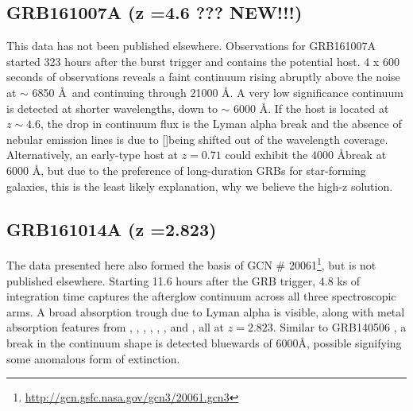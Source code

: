 \documentclass[iop, twocolappendix, numberedappendix, tighten, appendixfloats]{emulateapj}
\newcommand{\oii}{[\ion{O}{2}]}
\newcommand{\feii}{\ion{Fe}{2}}
\newcommand{\civ}{\ion{C}{4}}
\newcommand{\cii}{\ion{C}{2}}
\newcommand{\mgii}{\ion{Mg}{2}}
\newcommand{\alii}{\ion{Al}{2}}
\newcommand{\aliii}{\ion{Al}{3}}
\newcommand{\SIii}{\ion{Si}{2}}
\begin{document}
	\subsection{GRB161007A (z =4.6 ??? NEW!!!)}
	This data has not been published elsewhere. Observations for GRB161007A started
	323 hours after the burst trigger and contains the potential host. 4 x 600 seconds
	of observations reveals a faint continuum rising abruptly above the noise at
	$\sim$ 6850 \AA~and continuing through 21000 \AA. A very low significance
	continuum is detected at shorter wavelengths, down to $\sim$ 6000 \AA. If the
	host is located at $z \sim 4.6$, the drop in continuum flux is the Lyman alpha
	break and the absence of nebular emission lines is due to \oii being shifted
	out of the wavelength coverage. Alternatively, an early-type host at $z = 0.71$
	could exhibit the 4000 \AA break at 6000 \AA, but due to the preference of
	long-duration GRBs for star-forming galaxies, this is the least likely
	explanation, why we believe the high-z solution.

	\subsection{GRB161014A (z =2.823)}
	The data presented here also formed the basis of GCN \#
	20061\footnote{\url{http://gcn.gsfc.nasa.gov/gcn3/20061.gcn3}}, but is not
	published elsewhere. Starting 11.6 hours after the GRB trigger, 4.8 ks of
	integration time captures the afterglow continuum across all three
	spectroscopic arms. A broad absorption trough due to Lyman alpha is visible,
	along with metal absorption features from \mgii, \SIii, \cii, \civ, \alii,
	\aliii, and	\feii, all at $z =2.823$. Similar to GRB140506 \citep{Fynbo2014}, a
	break in the continuum shape is detected bluewards of 6000\AA, possible
	signifying some anomalous form of extinction.
\end{document}
